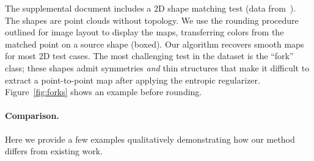 The supplemental document includes a 2D shape matching test (data from~\cite{thakoor-2007}).  The shapes are point clouds without topology.  We use the rounding procedure outlined for image layout to display the maps, transferring colors from the matched point on a source shape (boxed). Our algorithm recovers smooth maps for most 2D test cases.  The most challenging test in the dataset is the ``fork'' class; these shapes admit symmetries \emph{and} thin structures that make it difficult to extract a point-to-point map after applying the entropic regularizer.  Figure~\ref{fig:forks} shows an example before rounding.


\paragraph*{Comparison.}  Here we provide a few examples qualitatively demonstrating how our method differs from existing work.

